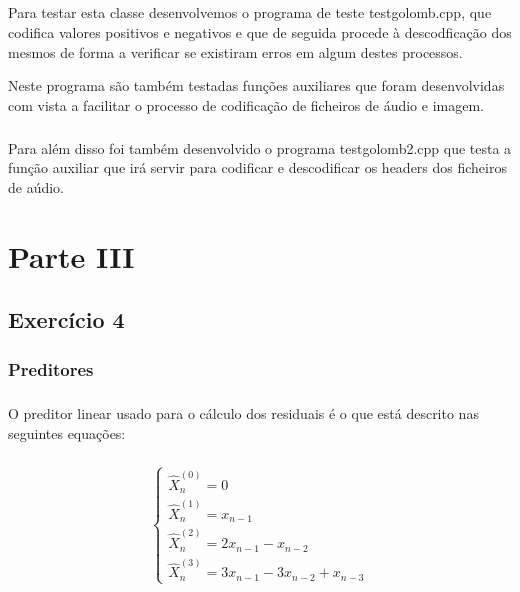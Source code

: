 \documentclass{report}
\begin{document}
\paragraph{}

Para testar esta classe desenvolvemos o programa de teste test\textunderscore golomb.cpp, que codifica valores positivos e negativos e que de seguida procede à descodficação dos mesmos de forma a verificar se existiram erros em algum destes processos. 

Neste programa são também testadas funções auxiliares que foram desenvolvidas com vista a facilitar o processo de codificação de ficheiros de áudio e imagem.

\paragraph{}
Para além disso foi também desenvolvido o programa  test\textunderscore golomb2.cpp que testa a função auxiliar que irá servir para codificar e descodificar os headers dos ficheiros de aúdio. 

	
\chapter{Parte III}
\label{chap.ParteIII}
\section{Exercício 4}
\paragraph{}
\subsection*{Preditores}
\paragraph{}O preditor linear usado para o cálculo dos residuais é o que está descrito nas seguintes
equações:
\paragraph{}

\begin{equation}
\left\{
\begin{array}{c}
     \hat{X}_n^{(0)} = 0  \\
     \hat{X}_n^{(1)} = x_{n-1} \\
     \hat{X}_n^{(2)} = 2x_{n-1} - x_{n-2} \\
     \hat{X}_n^{(3)} = 3x_{n-1} - 3x_{n-2} + x_{n-3}
     
\end{array}
\right.    
\end{equation}
\end{document}
